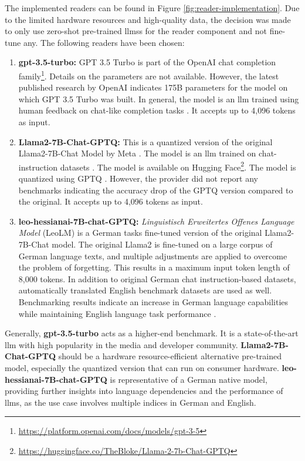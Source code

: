 The implemented readers can be found in Figure \ref{fig:reader-implementation}. Due to the limited hardware resources and high-quality data, the decision was made to only use zero-shot pre-trained \glspl{llm}s for the reader component and not fine-tune any. The following readers have been chosen:

\begin{enumerate}
    \item \textbf{gpt-3.5-turbo:} GPT 3.5 Turbo is part of the OpenAI chat completion family\footnote{\url{https://platform.openai.com/docs/models/gpt-3-5}}. Details on the parameters are not available. However, the latest published research by OpenAI indicates 175B parameters for the model on which GPT 3.5 Turbo was built. In general, the model is an \gls{llm} trained using human feedback on chat-like completion tasks \cite{ouyang_training_2022}. It accepts up to 4,096 tokens as input.
    \item \textbf{Llama2-7B-Chat-GPTQ:} This is a quantized version of the original Llama2-7B-Chat Model by Meta \cite{touvron_llama_2023}. The model is an \gls{llm} trained on chat-instruction datasets \cite{ouyang_training_2022}. The model is available on Hugging Face\footnote{\url{https://huggingface.co/TheBloke/Llama-2-7b-Chat-GPTQ}}. The model is quantized using GPTQ \cite{muennighoff_sgpt_2022}. However, the provider did not report any benchmarks indicating the accuracy drop of the GPTQ version compared to the original. It accepts up to 4,096 tokens as input.
    \item \textbf{leo-hessianai-7B-chat-GPTQ:} \textit{Linguistisch Erweitertes Offenes Language Model} (LeoLM) is a German tasks fine-tuned version of the original Llama2-7B-Chat model. The original Llama2 is fine-tuned on a large corpus of German language texts, and multiple adjustments are applied to overcome the problem of forgetting. This results in a maximum input token length of 8,000 tokens. In addition to original German chat instruction-based datasets, automatically translated English benchmark datasets are used as well. Benchmarking results indicate an increase in German language capabilities while maintaining English language task performance \cite{pluster_leolm_2023}.
\end{enumerate}

Generally, \textbf{gpt-3.5-turbo} acts as a higher-end benchmark. It is a state-of-the-art \gls{llm} with high popularity in the media and developer community. \textbf{Llama2-7B-Chat-GPTQ} should be a hardware resource-efficient alternative pre-trained model, especially the quantized version that can run on consumer hardware. \textbf{leo-hessianai-7B-chat-GPTQ} is representative of a German native model, providing further insights into language dependencies and the performance of \gls{llm}s, as the use case involves multiple indices in German and English.

